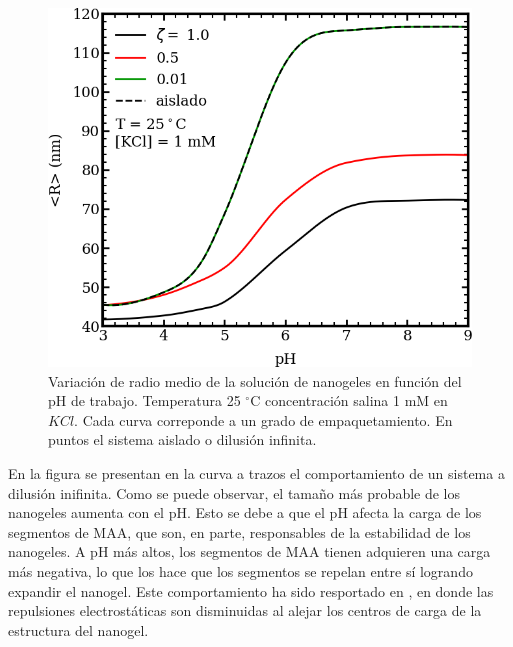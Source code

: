 	
	\begin{figure}[!htb]
		\centering
		\includegraphics[width=0.45\linewidth]{Figures/graph-mc/rvspH-phis.png}
		\caption{Variaci\'on de radio medio de la soluci\'on de nanogeles en funci\'on del pH de trabajo. Temperatura 25 $^\circ$C concentraci\'on salina 1 mM en $KCl$. Cada curva correponde a un grado de empaquetamiento. En puntos el sistema aislado o dilusi\'on infinita.}
		\label{fig:mc:rvspH}
	\end{figure}
	
	
	En la figura se presentan en la curva a trazos el comportamiento de un sistema a dilusi\'on inifinita.
	Como se puede observar, el tama\~no m\'as probable de los nanogeles aumenta con el pH. Esto se debe a que el pH afecta la carga de los segmentos de MAA, que son, en parte,  responsables de la estabilidad de los nanogeles. A pH m\'as altos, los segmentos de MAA tienen adquieren una carga m\'as negativa, lo que los hace que los segmentos se repelan entre s\'i logrando expandir el nanogel.
	Este comportamiento ha sido resportado en \cite{perez2021thermodynamic}, en donde las repulsiones electrost\'aticas son disminuidas al alejar los centros de carga de la estructura del nanogel.
	
